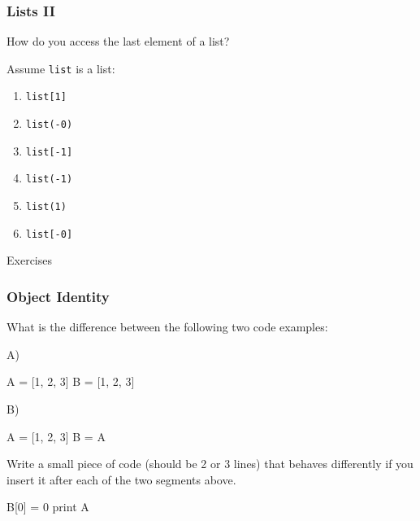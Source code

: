 \begin{frame}
\frametitle{Lists II}

How do you access the last element of a list?

Assume \texttt{list} is a list:

\begin{enumerate}
\item \texttt{list[1]}
\item \texttt{list(-0)}
\item \texttt{list[-1]}
\item \texttt{list(-1)}
\item \texttt{list(1)}
\item \texttt{list[-0]}
\end{enumerate}
\end{frame}

\begin{frame}
{}

\bigskip
\bigskip
\bigskip
Exercises
\end{frame}

\begin{frame}[fragile]
\frametitle{Object Identity}

What is the difference between the following two code examples:

A)
\begin{python}
A = [1, 2, 3]
B = [1, 2, 3]
\end{python}

B)

\begin{python}
A = [1, 2, 3]
B = A
\end{python}

Write a small piece of code (should be 2 or 3 lines) that behaves differently
if you insert it after each of the two segments above.

\pause

\begin{python}
B[0] = 0
print A
\end{python}

\end{frame}


